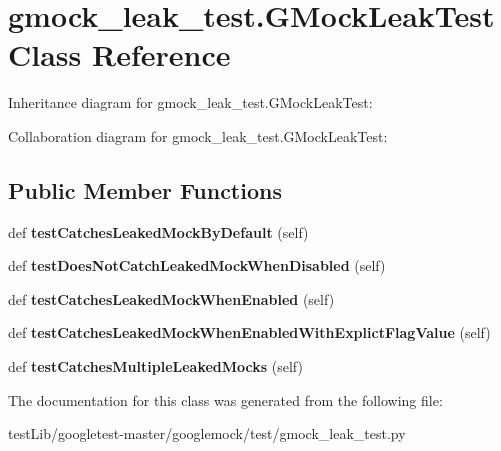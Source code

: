 \hypertarget{classgmock__leak__test_1_1GMockLeakTest}{}\section{gmock\+\_\+leak\+\_\+test.\+G\+Mock\+Leak\+Test Class Reference}
\label{classgmock__leak__test_1_1GMockLeakTest}


Inheritance diagram for gmock\+\_\+leak\+\_\+test.\+G\+Mock\+Leak\+Test\+:


Collaboration diagram for gmock\+\_\+leak\+\_\+test.\+G\+Mock\+Leak\+Test\+:
\subsection*{Public Member Functions}
\begin{DoxyCompactItemize}
\item 
\mbox{\label{classgmock__leak__test_1_1GMockLeakTest_ad87d271de7b3f106e51272d6e9139c76}} 
def {\bfseries test\+Catches\+Leaked\+Mock\+By\+Default} (self)
\item 
\mbox{\label{classgmock__leak__test_1_1GMockLeakTest_a3107bf5a603558ab2d97d88fb5589951}} 
def {\bfseries test\+Does\+Not\+Catch\+Leaked\+Mock\+When\+Disabled} (self)
\item 
\mbox{\label{classgmock__leak__test_1_1GMockLeakTest_a78f4040a392d183597f71d92da8c1246}} 
def {\bfseries test\+Catches\+Leaked\+Mock\+When\+Enabled} (self)
\item 
\mbox{\label{classgmock__leak__test_1_1GMockLeakTest_ab19cf302ea06e1b186bd6ab951d9161e}} 
def {\bfseries test\+Catches\+Leaked\+Mock\+When\+Enabled\+With\+Explict\+Flag\+Value} (self)
\item 
\mbox{\label{classgmock__leak__test_1_1GMockLeakTest_a09465b2bfde98834e4bb9563c035f034}} 
def {\bfseries test\+Catches\+Multiple\+Leaked\+Mocks} (self)
\end{DoxyCompactItemize}


The documentation for this class was generated from the following file\+:\begin{DoxyCompactItemize}
\item 
test\+Lib/googletest-\/master/googlemock/test/gmock\+\_\+leak\+\_\+test.\+py\end{DoxyCompactItemize}
